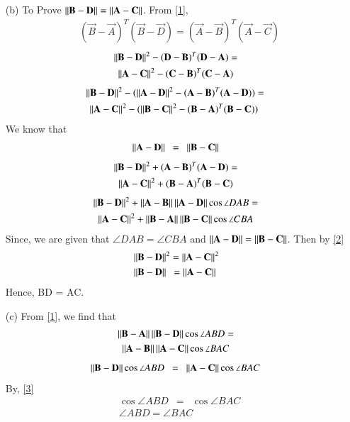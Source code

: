 \documentclass[journal,12pt,twocolumn]{IEEEtran}
\begin{document}
\begin{enumerate}
\item[(b)] To Prove $\left\lVert\mathbf{B} - \mathbf{D}\right\rVert = \left\lVert\mathbf{A} - \mathbf{C}\right\rVert$. From \ref{1},
\begin{align}
	& (\vec B -\vec A)^T(\vec{B}-\vec{D}) = (\vec A -\vec B)^T(\vec{A}-\vec{C})
\end{align}
\begin{multline}
\left\lVert\mathbf{B}-\mathbf{D}\right\rVert^2 - (\mathbf D -\mathbf B)^T(\mathbf{D}-\mathbf{A})= \\ \left\lVert\mathbf{A}-\mathbf{C}\right\rVert^2 - (\mathbf C -\mathbf B)^T(\mathbf{C}-\mathbf{A})	
\end{multline}
\begin{multline}
 \norm{\vec{B}-\vec{D}}^2 - (\norm{\vec{A}-\vec{D}}^2 - (\vec A -\vec B)^T(\vec A -\vec D))   = \\
 \norm{\vec{A}-\vec{C}}^2 - (\norm{\vec{B}-\vec{C}}^2 - (\vec B -\vec A)^T(\vec B -\vec C))\	
\end{multline}
We know that
\begin{equation}
	\left\lVert\mathbf{A}-\mathbf{D}\right\rVert\enspace = \enspace \left\lVert\mathbf{B}-\mathbf{C}\right\rVert 
\end{equation}
\begin{multline}
\left\lVert\mathbf{B}-\mathbf{D}\right\rVert^2 + (\mathbf A -\mathbf B)^T(\mathbf{A}-\mathbf{D}) = \\ \left\lVert\mathbf{A}-\mathbf{C}\right\rVert^2 + (\mathbf B -\mathbf A)^T(\mathbf{B}-\mathbf{C}) 	
\end{multline}
\begin{multline}
\left\lVert\mathbf{B}-\mathbf{D}\right\rVert^2 + \left\lVert\mathbf{A}-\mathbf{B}\right\rVert\left\lVert\mathbf{A}-\mathbf{D}\right\rVert\cos \angle DAB = \\
 \left\lVert\mathbf{A}-\mathbf{C}\right\rVert^2 + \left\lVert\mathbf{B}-\mathbf{A}\right\rVert\left\lVert\mathbf{B}-\mathbf{C}\right\rVert\cos \angle CBA \label{2}	
\end{multline}
Since, we are given that $\angle DAB = \angle CBA$ and $\left\lVert\mathbf{A}-\mathbf{D}\right\rVert = \left\lVert\mathbf{B}-\mathbf{C}\right\rVert$. Then by \ref{2}
\begin{align}
	& \left\lVert\mathbf{B}-\mathbf{D}\right\rVert^2 = \left\lVert\mathbf{A}-\mathbf{C}\right\rVert^2 \\
	& \label{3}\left\lVert\mathbf{B}-\mathbf{D}\right\rVert \enspace = \left\lVert\mathbf{A}-\mathbf{C}\right\rVert
\end{align}
Hence, BD = AC.
\end{enumerate}
\begin{enumerate}
	\item[(c)] From \ref{1}, we find that
	\begin{multline}
		 \left\lVert\mathbf{B} - \mathbf{A}\right\rVert\left\lVert\mathbf{B} - \mathbf{D}\right\rVert\cos\angle ABD  = \\ \left\lVert\mathbf{A} - \mathbf{B}\right\rVert\left\lVert\mathbf{A} - \mathbf{C}\right\rVert\cos\angle BAC \\
	\end{multline}
\begin{equation}
	 \left\lVert\mathbf{B} - \mathbf{D}\right\rVert\cos\angle ABD \enspace = \enspace \left\lVert\mathbf{A} - \mathbf{C}\right\rVert\cos\angle BAC
\end{equation}
By, \ref{3}
\begin{align}
	& \cos\angle ABD \enspace = \enspace \cos\angle BAC \\
	& \angle ABD = \angle BAC
\end{align}
\end{enumerate}
\end{document}
